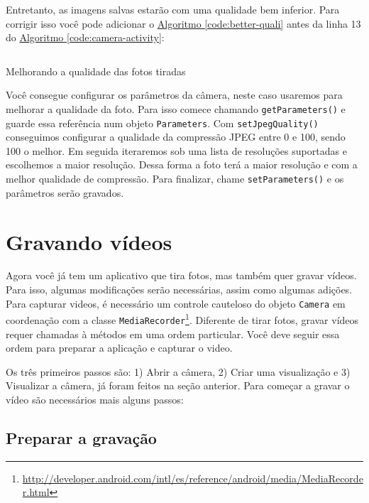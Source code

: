 \documentclass[a4paper,12pt,brazil,oneside]{book}
\begin{document}
		Entretanto, as imagens salvas estarão com uma qualidade bem inferior. Para corrigir isso você pode adicionar o \hyperref[code:better-quali]{Algoritmo \ref*{code:better-quali}} antes da linha 13 do \hyperref[code:camera-activity]{Algoritmo \ref*{code:camera-activity}}:
	
		\begin{listing}[H]
		\inputminted[linenos=true,fontsize=\small,frame=lines, framesep=2mm, tabsize=2,numbersep=5pt]{java}{src/api/camera/params.java}
		\caption{Melhorando a qualidade das fotos tiradas}
		\label{code:better-quali}
		\end{listing} 			

		Você consegue configurar os parâmetros da câmera, neste caso usaremos para melhorar a qualidade da foto. Para isso comece chamando \texttt{getParameters()} e guarde essa referência num objeto \texttt{Parameters}. Com \texttt{setJpegQuality()} conseguimos configurar a qualidade da compressão JPEG entre 0 e 100, sendo 100 o melhor. Em seguida iteraremos sob uma lista de resoluções suportadas e escolhemos a maior resolução. Dessa forma a foto terá a maior resolução e com a melhor qualidade de compressão.
		Para finalizar, chame \texttt{setParameters()} e os parâmetros serão gravados.

	\section{Gravando vídeos}

		Agora você já tem um aplicativo que tira fotos, mas também quer gravar vídeos. Para isso, algumas modificações serão necessárias, assim como algumas adições. Para capturar videos, é necessário um controle cauteloso do objeto \texttt{Camera} em coordenação com a classe \texttt{MediaRecorder}\footnote{\href{http://developer.android.com/intl/es/reference/android/media/MediaRecorder.html}{http://developer.android.com/intl/es/reference/android/media/MediaRecorder.html}}. Diferente de tirar fotos, gravar vídeos requer chamadas à métodos em uma ordem particular. Você deve seguir essa ordem para preparar a aplicação e capturar o video. 

		Os três primeiros passos são: 1) Abrir a câmera, 2) Criar uma visualização e 3) Visualizar a câmera, já foram feitos na seção anterior. Para começar a gravar o vídeo são necessários mais alguns passos:

	\subsection{Preparar a gravação}
\end{document}
